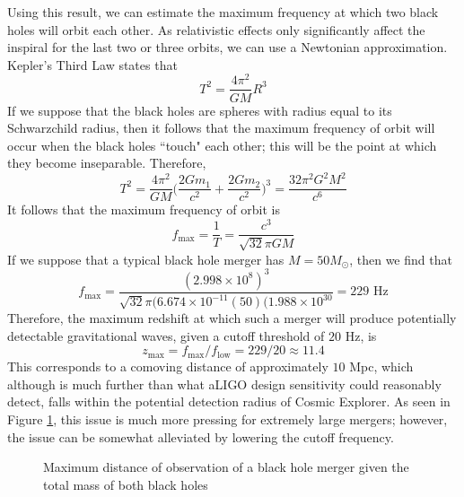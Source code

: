 \documentclass{article}
\begin{document}
Using this result, we can estimate the maximum frequency at which two black holes will orbit each other. As relativistic effects only significantly affect the inspiral for the last two or three orbits, we can use a Newtonian approximation. Kepler's Third Law states that 
\begin{equation}
    T^2 = \frac{4\pi^2}{GM}R^3
\end{equation}
If we suppose that the black holes are spheres with radius equal to its Schwarzchild radius, then it follows that the maximum frequency of orbit will occur when the black holes ``touch" each other; this will be the point at which they become inseparable. Therefore, 
\begin{equation}
    T^2 = \frac{4\pi^2}{GM} \Big( \frac{2Gm_1}{c^2} + \frac{2Gm_2}{c^2} \Big)^3 = \frac{32\pi^2 G^2 M^2}{c^6}
\end{equation}
It follows that the maximum frequency of orbit is 
\begin{equation}
    f_{\text{max}} = \frac{1}{T} = \frac{c^3}{\sqrt{32} \pi GM}
\end{equation}
If we suppose that a typical black hole merger has $M = 50 M_\odot$, then we find that 
\begin{equation}
    f_\text{max} = \frac{(2.998\times 10^8)^3}{\sqrt{32} \pi (6.674 \times 10^{-11} (50) (1.988 \times 10^{30}} = 229 \text{ Hz}
\end{equation}
Therefore, the maximum redshift at which such a merger will produce potentially detectable gravitational waves, given a cutoff threshold of $20$ Hz, is 
\begin{equation}
    z_\text{max} = f_\text{max} / f_\text{low} = 229 / 20 \approx 11.4
\end{equation}
This corresponds to a comoving distance of approximately $10$ Mpc, which although is much further than what aLIGO design sensitivity could reasonably detect, falls within the potential detection radius of Cosmic Explorer. As seen in Figure \ref{fig:maxdistance}, this issue is much more pressing for extremely large mergers; however, the issue can be somewhat alleviated by lowering the cutoff frequency. 

\begin{figure}[!htb]
    \caption{\label{fig:maxdistance} Maximum distance of observation of a black hole merger given the total mass of both black holes}
\end{figure}
\end{document}
